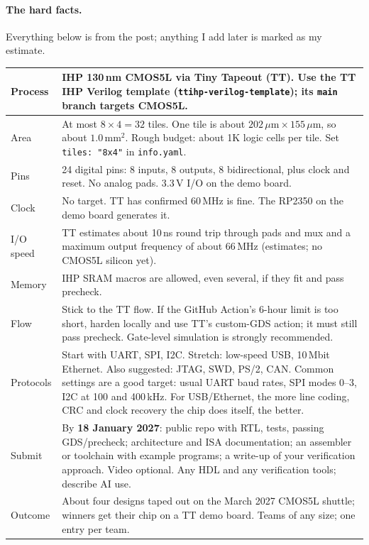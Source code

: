 \paragraph{The hard facts.} Everything below is from the post; anything I add
later is marked as my estimate.
\begin{center}
\begin{tabular}{|p{3.6cm}|p{10.6cm}|}
\hline
Process & IHP 130\,nm CMOS5L via Tiny Tapeout (TT). Use the TT IHP Verilog
template (\texttt{ttihp-verilog-template}); its \texttt{main} branch targets
CMOS5L. \\ \hline
Area & At most $8\times4 = 32$ tiles. One tile is about
$202\,\mu\mathrm{m}\times155\,\mu\mathrm{m}$, so about $1.0\,\mathrm{mm}^2$.
Rough budget: about 1K logic cells per tile. Set \texttt{tiles: "8x4"} in
\texttt{info.yaml}. \\ \hline
Pins & 24 digital pins: 8 inputs, 8 outputs, 8 bidirectional, plus clock and
reset. No analog pads. 3.3\,V I/O on the demo board. \\ \hline
Clock & No target. TT has confirmed 60\,MHz is fine. The RP2350 on the demo
board generates it. \\ \hline
I/O speed & TT estimates about 10\,ns round trip through pads and mux and a
maximum output frequency of about 66\,MHz (estimates; no CMOS5L silicon yet).
\\ \hline
Memory & IHP SRAM macros are allowed, even several, if they fit and pass
precheck. \\ \hline
Flow & Stick to the TT flow. If the GitHub Action's 6-hour limit is too short,
harden locally and use TT's custom-GDS action; it must still pass precheck.
Gate-level simulation is strongly recommended. \\ \hline
Protocols & Start with UART, SPI, I2C. Stretch: low-speed USB, 10\,Mbit
Ethernet. Also suggested: JTAG, SWD, PS/2, CAN. Common settings are a good
target: usual UART baud rates, SPI modes 0--3, I2C at 100 and 400\,kHz. For
USB/Ethernet, the more line coding, CRC and clock recovery the chip does
itself, the better. \\ \hline
Submit & By \textbf{18 January 2027}: public repo with RTL, tests, passing
GDS/precheck; architecture and ISA documentation; an assembler or toolchain
with example programs; a write-up of your verification approach. Video
optional. Any HDL and any verification tools; describe AI use. \\ \hline
Outcome & About four designs taped out on the March 2027 CMOS5L shuttle;
winners get their chip on a TT demo board. Teams of any size; one entry per
team. \\ \hline
\end{tabular}
\end{center}

